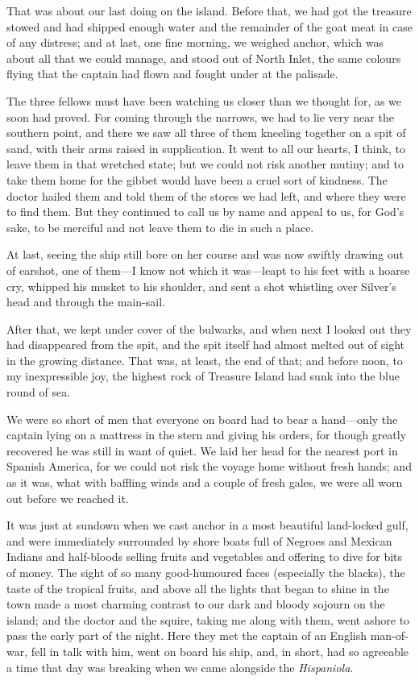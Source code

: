 That was about our last doing on the island. Before that, we had got the treasure stowed and had shipped enough water and the remainder of the goat meat in case of any distress; and at last, one fine morning, we weighed anchor, which was about all that we could manage, and stood out of North Inlet, the same colours flying that the captain had flown and fought under at the palisade.

The three fellows must have been watching us closer than we thought for, as we soon had proved. For coming through the narrows, we had to lie very near the southern point, and there we saw all three of them kneeling together on a spit of sand, with their arms raised in supplication. It went to all our hearts, I think, to leave them in that wretched state; but we could not risk another mutiny; and to take them home for the gibbet would have been a cruel sort of kindness. The doctor hailed them and told them of the stores we had left, and where they were to find them. But they continued to call us by name and appeal to us, for God’s sake, to be merciful and not leave them to die in such a place.

At last, seeing the ship still bore on her course and was now swiftly drawing out of earshot, one of them---I know not which it was---leapt to his feet with a hoarse cry, whipped his musket to his shoulder, and sent a shot whistling over Silver’s head and through the main-sail.

After that, we kept under cover of the bulwarks, and when next I looked out they had disappeared from the spit, and the spit itself had almost melted out of sight in the growing distance. That was, at least, the end of that; and before noon, to my inexpressible joy, the highest rock of Treasure Island had sunk into the blue round of sea.

We were so short of men that everyone on board had to bear a hand---only the captain lying on a mattress in the stern and giving his orders, for though greatly recovered he was still in want of quiet. We laid her head for the nearest port in Spanish America, for we could not risk the voyage home without fresh hands; and as it was, what with baffling winds and a couple of fresh gales, we were all worn out before we reached it.

It was just at sundown when we cast anchor in a most beautiful land-locked gulf, and were immediately surrounded by shore boats full of Negroes and Mexican Indians and half-bloods selling fruits and vegetables and offering to dive for bits of money. The sight of so many good-humoured faces (especially the blacks), the taste of the tropical fruits, and above all the lights that began to shine in the town made a most charming contrast to our dark and bloody sojourn on the island; and the doctor and the squire, taking me along with them, went ashore to pass the early part of the night. Here they met the captain of an English man-of-war, fell in talk with him, went on board his ship, and, in short, had so agreeable a time that day was breaking when we came alongside the \textit{Hispaniola}.

